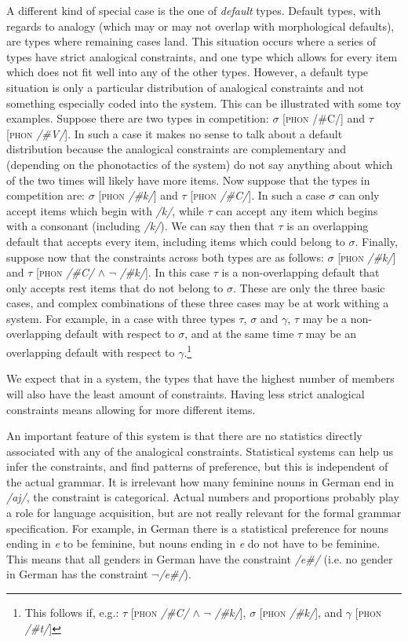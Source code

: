 A different kind of special case is the one of \textit{default} types. Default types, with regards to analogy (which may or may not overlap with morphological defaults), are types where remaining cases land. This situation occurs where a series of types have strict analogical constraints, and one type which allows for every item which does not fit well into any of the other types. However, a default type situation is only a particular distribution of analogical constraints and not something especially coded into the system. This can be illustrated with some toy examples. Suppose there are two types in competition: $\sigma$ [\textsc{phon} /\#C/] and $\tau$ [\textsc{phon} \textit{/\#V/}]. In such a case it makes no sense to talk about a default distribution because the analogical constraints are complementary and (depending on the phonotactics of the system) do not say anything about which of the two times will likely have more items. Now suppose that the types in competition are: $\sigma$ [\textsc{phon} \textit{/\#k/}] and $\tau$ [\textsc{phon} \textit{/\#C/}]. In such a case $\sigma$ can only accept items which begin with \textit{/k/}, while $\tau$ can accept any item which begins with a consonant (including \textit{/k/}). We can say then that $\tau$ is an overlapping default that accepts every item, including items which could belong to $\sigma$. Finally, suppose now that the constraints across both types are as follows: $\sigma$ [\textsc{phon} \textit{/\#k/}] and $\tau$ [\textsc{phon} \textit{/\#C/} $\land$ $\lnot$ \textit{/\#k/}]. In this case $\tau$ is a non-overlapping default that only accepts rest items that do not belong to $\sigma$. These are only the three basic cases, and complex combinations of these three cases may be at work withing a system. For example, in a case with three types $\tau$, $\sigma$ and $\gamma$, $\tau$ may be a non-overlapping default with respect to $\sigma$, and at the same time $\tau$ may be an overlapping default with respect to $\gamma$.\footnote{This follows if, e.g.: $\tau$ [\textsc{phon} \textit{/\#C/} $\land$ $\lnot$ \textit{/\#k/}], $\sigma$ [\textsc{phon} \textit{/\#k/}], and $\gamma$ [\textsc{phon} \textit{/\#t/}]}

We expect that in a system, the types that have the highest number of members will also have the least amount of constraints. Having less strict analogical constraints means allowing for more different items.

An important feature of this system is that there are no statistics directly associated with any of the analogical constraints. Statistical systems can help us infer the constraints, and find patterns of preference, but this is independent of the actual grammar. It is irrelevant how many feminine nouns in German end in \textit{/aj/}, the constraint is categorical. Actual numbers and proportions probably play a role for language acquisition, but are not really relevant for the formal grammar specification. For example, in German there is a statistical preference for nouns ending in \textit{e} to be feminine, but nouns ending in \textit{e} do not have to be feminine. This means that all genders in German have the constraint \textit{/e\#/} (i.e. no gender in German has the constraint \textit{$\lnot$/e\#/}).

